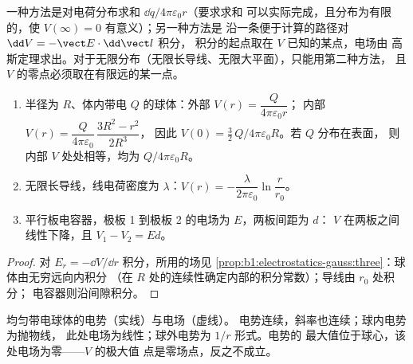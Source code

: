 \begin{method}[计算电势]\label{meth:b1:potential-capacitors:compute}
一种方法是对电荷分布求和 $\dd q/4\pi\varepsilon_0r$（要求求和
可以实际完成，且分布为有限的，使 $V(\infty) = 0$ 有意义）；另一种方法是
沿一条便于计算的路径对 $\dd V = -\vect E\cdot\dd\vect l$ 积分，
积分的起点取在 $V$ 已知的某点，电场由
高斯定理求出。对于无限分布（无限长导线、无限大平面），只能用第二种方法，
且 $V$ 的零点必须取在有限远的某一点。
\end{method}

\begin{proposition}[典型分布的电势]\label{prop:b1:potential-capacitors:classic}
\begin{enumerate}
  \item 半径为 $R$、体内带电 $Q$ 的球体：外部 $V(r) = \dfrac{Q}{4\pi\varepsilon_0r}$；
        内部 $V(r) = \dfrac{Q}{4\pi\varepsilon_0}\,\dfrac{3R^2 - r^2}{2R^3}$，
        因此 $V(0) = \tfrac32\,Q/4\pi\varepsilon_0R$。若 $Q$ 分布在表面，
        则内部 $V$ 处处相等，均为 $Q/4\pi\varepsilon_0R$。
  \item 无限长导线，线电荷密度为 $\lambda$：$V(r) = -\dfrac{\lambda}{2\pi\varepsilon_0}\ln\dfrac{r}{r_0}$。
  \item 平行板电容器，极板 1 到极板 2 的电场为 $E$，两板间距为 $d$：
        $V$ 在两板之间线性下降，且 $V_1 - V_2 = Ed$。
\end{enumerate}
\end{proposition}

\begin{proof}
对 $E_r = -\dd V/\dd r$ 积分，所用的场见
\cref{prop:b1:electrostatics-gauss:three}：球体由无穷远向内积分
（在 $R$ 处的连续性确定内部的积分常数）；导线由 $r_0$ 处积分；
电容器则沿间隙积分。
\end{proof}

\begin{omfigure}

{\small 均匀带电球体的电势（实线）与电场（虚线）。
电势连续，斜率也连续；球内电势为抛物线，
此处电场为线性；球外电势为 $1/r$ 形式。电势的
最大值位于球心，该处电场为零——$V$ 的极大值
点是零场点，反之不成立。}
\end{omfigure}

